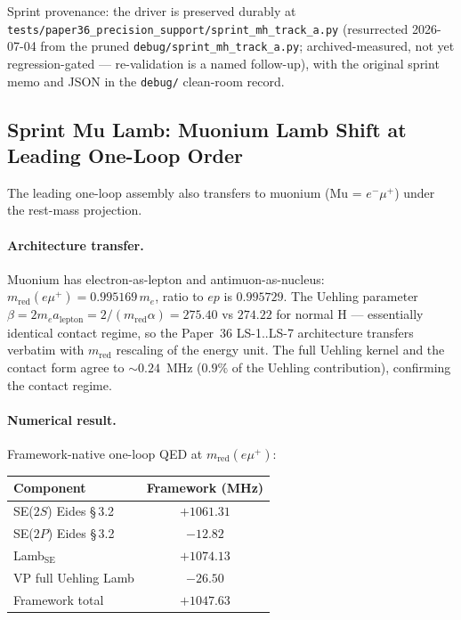 \documentclass[11pt]{article}
\begin{document}
Sprint provenance: the driver is preserved durably at
\texttt{tests/paper36\_precision\_support/sprint\_mh\_track\_a.py}
(resurrected 2026-07-04 from the pruned
\texttt{debug/sprint\_mh\_track\_a.py}; archived-measured, not yet
regression-gated --- re-validation is a named follow-up), with the
original sprint memo and JSON in the \texttt{debug/} clean-room
record.

\subsection{Sprint Mu Lamb: Muonium Lamb Shift at Leading One-Loop Order}
\label{sec:sprint_mu_lamb}

The leading one-loop assembly also transfers to muonium
(Mu = $e^- \mu^+$) under the rest-mass projection.

\paragraph{Architecture transfer.}  Muonium has electron-as-lepton and
antimuon-as-nucleus: $m_\text{red}(e\mu^+) = 0.995169\, m_e$, ratio to
$ep$ is $0.995729$.  The Uehling parameter $\beta = 2 m_e a_\text{lepton} =
2/(m_\text{red} \alpha) = 275.40$ vs $274.22$ for normal H --- essentially
identical contact regime, so the Paper~36 LS-1..LS-7 architecture
transfers verbatim with $m_\text{red}$ rescaling of the energy unit.
The full Uehling kernel and the contact form agree to $\sim 0.24$~MHz
($0.9\%$ of the Uehling contribution), confirming the contact regime.

\paragraph{Numerical result.}  Framework-native one-loop QED at
$m_\text{red}(e\mu^+)$:

\begin{tabular}{lc}
\toprule
Component & Framework (MHz) \\
\midrule
SE($2S$) Eides \S\,3.2 & $+1061.31$ \\
SE($2P$) Eides \S\,3.2 & $-12.82$ \\
Lamb$_\text{SE}$ & $+1074.13$ \\
VP full Uehling Lamb & $-26.50$ \\
\midrule
Framework total & $+1047.63$ \\
\bottomrule
\end{tabular}
\end{document}
